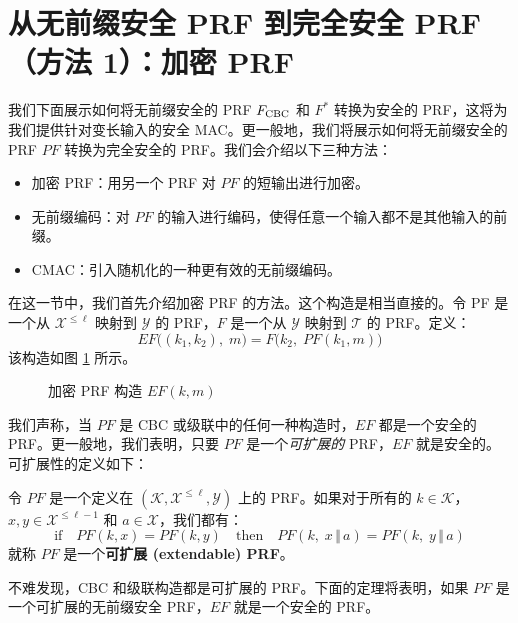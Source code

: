 \section{从无前缀安全 PRF 到完全安全 PRF（方法 1）：加密 PRF}\label{sec:6-5}

我们下面展示如何将无前缀安全的 PRF $F_{\rm CBC}$ 和 $F^*$ 转换为安全的 PRF，这将为我们提供针对变长输入的安全 MAC。更一般地，我们将展示如何将无前缀安全的 PRF $PF$ 转换为完全安全的 PRF。我们会介绍以下三种方法：
\begin{itemize}
	\item 加密 PRF：用另一个 PRF 对 $PF$ 的短输出进行加密。
	\item 无前缀编码：对 $PF$ 的输入进行编码，使得任意一个输入都不是其他输入的前缀。
	\item CMAC：引入随机化的一种更有效的无前缀编码。
\end{itemize}
在这一节中，我们首先介绍加密 PRF 的方法。这个构造是相当直接的。令 PF 是一个从 $\mathcal{X}^{\leq\ell}$ 映射到 $\mathcal{Y}$ 的 PRF，$F$ 是一个从 $\mathcal{Y}$ 映射到 $\mathcal{T}$ 的 PRF。定义：
\begin{equation}\label{eq:6-17}
EF\big((k_1,k_2),\;m\big)=F\big(k_2,\;PF(k_1,m)\big)
\end{equation}
该构造如图 \ref{fig:6-4} 所示。

\begin{figure}
  \centering
  
  \caption{加密 PRF 构造 $EF(k,m)$}
  \label{fig:6-4}
\end{figure}

我们声称，当 $PF$ 是 CBC 或级联中的任何一种构造时，$EF$ 都是一个安全的 PRF。更一般地，我们表明，只要 $PF$ 是一个\emph{可扩展的} PRF，$EF$ 就是安全的。可扩展性的定义如下：

\begin{definition}\label{def:6-4}
令 $PF$ 是一个定义在 $(\mathcal{K},\mathcal{X}^{\leq\ell},\mathcal{Y})$ 上的 PRF。如果对于所有的 $k\in\mathcal{K}$，$x,y\in\mathcal{X}^{\leq\ell-1}$ 和 $a\in\mathcal{X}$，我们都有：
\[
\text{if}\quad
PF(k,x)=PF(k,y)
\quad\text{then}\quad
PF(k,\;x\,\Vert\,a)=PF(k,\;y\,\Vert\,a)
\]
就称 $PF$ 是一个\textbf{可扩展 (extendable) PRF}。
\end{definition}

不难发现，CBC 和级联构造都是可扩展的 PRF。下面的定理将表明，如果 $PF$ 是一个可扩展的无前缀安全 PRF，$EF$ 就是一个安全的 PRF。

